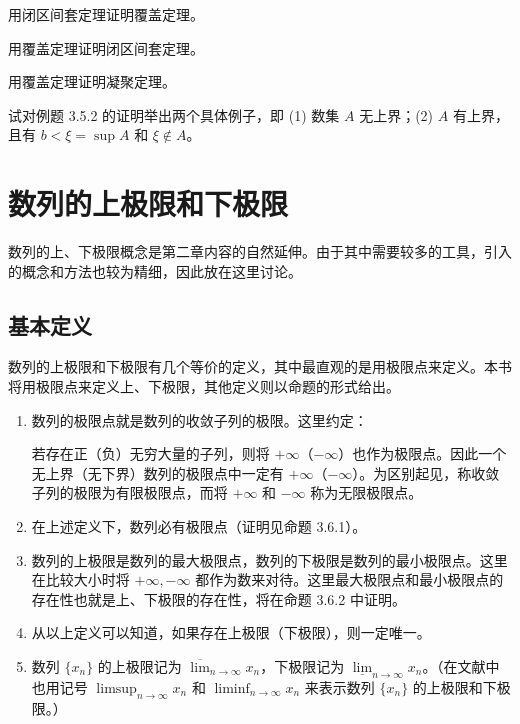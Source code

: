 \begin{xexercise}[2]
用闭区间套定理证明覆盖定理。
\end{xexercise}

\begin{xexercise}[3]
用覆盖定理证明闭区间套定理。
\end{xexercise}

\begin{xexercise}[4]
用覆盖定理证明凝聚定理。
\end{xexercise}

\begin{xexercise}[5]
试对例题 3.5.2 的证明举出两个具体例子，即 (1) 数集 $A$ 无上界；(2) $A$ 有上界，且有 $b<\xi=\sup A$ 和 $\xi\notin A$。
\end{xexercise}

\section{数列的上极限和下极限}

数列的上、下极限概念是第二章内容的自然延伸。由于其中需要较多的工具，引入的概念和方法也较为精细，因此放在这里讨论。

\subsection{基本定义}

数列的上极限和下极限有几个等价的定义，其中最直观的是用极限点来定义。本书将用极限点来定义上、下极限，其他定义则以命题的形式给出。

\begin{enumerate}
  \item 数列的极限点就是数列的收敛子列的极限。这里约定：

  若存在正（负）无穷大量的子列，则将 $+\infty$（$-\infty$）也作为极限点。因此一个无上界（无下界）数列的极限点中一定有 $+\infty$（$-\infty$）。为区别起见，称收敛子列的极限为有限极限点，而将 $+\infty$ 和 $-\infty$ 称为无限极限点。
  \item 在上述定义下，数列必有极限点（证明见命题 3.6.1）。
  \item 数列的上极限是数列的最大极限点，数列的下极限是数列的最小极限点。这里在比较大小时将 $+\infty,-\infty$ 都作为数来对待。这里最大极限点和最小极限点的存在性也就是上、下极限的存在性，将在命题 3.6.2 中证明。
  \item 从以上定义可以知道，如果存在上极限（下极限），则一定唯一。
  \item 数列 $\{x_n\}$ 的上极限记为 $\overline{\lim}_{n\to\infty}x_n$，下极限记为 $\underline{\lim}_{n\to\infty}x_n$。（在文献中也用记号 $\limsup_{n\to\infty}x_n$ 和 $\liminf_{n\to\infty}x_n$ 来表示数列 $\{x_n\}$ 的上极限和下极限。）
\end{enumerate}

